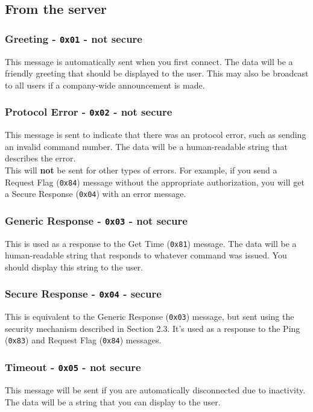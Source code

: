 \documentclass{report}
\newcommand{\code}[1]{\texttt{#1}}
\begin{document}
\subsection{From the server}
\subsubsection{Greeting - \code{0x01} - not secure}
This message is automatically sent when you first connect.
The data will be a friendly greeting that should be displayed to the user.
This may also be broadcast to all users if a company-wide announcement is made.

\subsubsection{Protocol Error - \code{0x02} - not secure}
This message is sent to indicate that there was an protocol error, such as sending an invalid command number.
The data will be a human-readable string that describes the error. \\
This will \textbf{not} be sent for other types of errors.
For example, if you send a Request Flag (\code{0x84}) message without the appropriate authorization, you will get a Secure Response (\code{0x04}) with an error message.

\subsubsection{Generic Response - \code{0x03} - not secure}
This is used as a response to the Get Time (\code{0x81}) message.
The data will be a human-readable string that responds to whatever command was issued. You should display this string to the user.

\subsubsection{Secure Response - \code{0x04} - secure}
This is equivalent to the Generic Response (\code{0x03}) message, but sent using the security mechanism described in Section 2.3.
It's used as a response to the Ping (\code{0x83}) and Request Flag (\code{0x84}) messages.

\subsubsection{Timeout - \code{0x05} - not secure}
This message will be sent if you are automatically disconnected due to inactivity. The data will be a string that you can display to the user.
\end{document}

